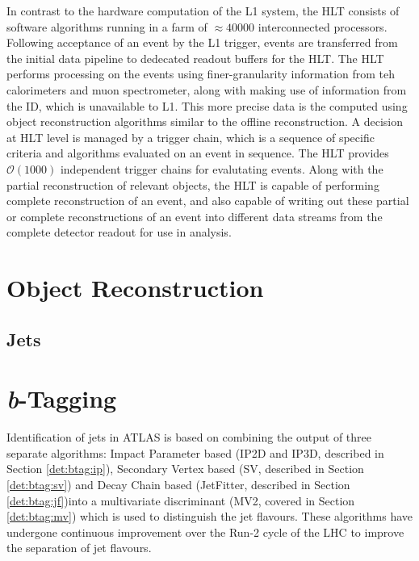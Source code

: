 	In contrast to the hardware computation of the L1 system, the HLT consists of software algorithms running in a farm  of $\approx40000$ interconnected processors\cite{trigrun22017}. Following acceptance of an event by the L1 trigger, events are transferred from the initial data pipeline to dedecated readout buffers for the HLT. The HLT performs processing on the events using finer-granularity information from teh calorimeters and muon spectrometer, along with making use of information from the ID, which is unavailable to L1. This more precise data is the computed using object reconstruction algorithms similar to the offline reconstruction. A decision at HLT level is managed by a trigger chain, which is a sequence of specific criteria and algorithms evaluated on an event in sequence. The HLT provides $\mathcal{O}(1000)$ independent trigger chains for evalutating events. Along with the partial reconstruction of relevant objects, the HLT is capable of performing complete reconstruction of an event, and also capable of writing out these partial or complete reconstructions of an event into different data streams from the complete detector readout for use in analysis. 
	



\section{Object Reconstruction}
	
	\subsection{Jets}
	
	\subsection{\bjets}

\section{\textit{b}-Tagging}
\label{det:btagging}

	Identification of \bquark jets in ATLAS is based on combining the output of three separate \btag algorithms: Impact Parameter based (IP2D and IP3D, described in Section \ref{det:btag:ip}), Secondary Vertex based (SV, described in Section \ref{det:btag:sv}) and Decay Chain based (JetFitter, described in Section \ref{det:btag:jf})into a multivariate discriminant (MV2, covered in Section \ref{det:btag:mv}) which is used to distinguish the jet flavours. These algorithms have undergone continuous improvement over the Run-2 cycle of the LHC to improve the separation of jet flavours. 
	
